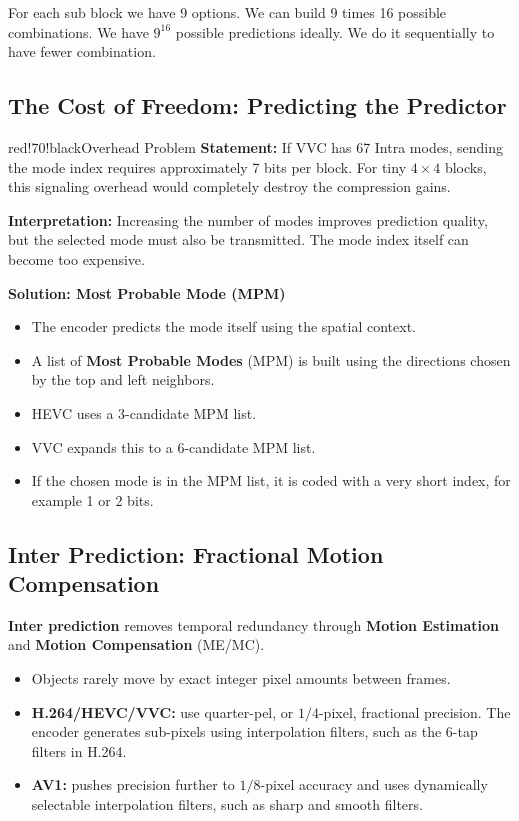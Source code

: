 For each sub block we have 9 options. We can build 9 times 16 possible combinations. We have $9^{16}$ possible predictions ideally. We do it sequentially to have fewer combination.
\subsection{The Cost of Freedom: Predicting the Predictor}

\begin{calloutbox}{red!70!black}{Overhead Problem}
\textbf{Statement:} If VVC has 67 Intra modes, sending the mode index requires approximately 7 bits per block. For tiny $4 \times 4$ blocks, this signaling overhead would completely destroy the compression gains.

\textbf{Interpretation:} Increasing the number of modes improves prediction quality, but the selected mode must also be transmitted. The mode index itself can become too expensive.
\end{calloutbox}

\textbf{Solution: Most Probable Mode (MPM)}

\begin{itemize}
\item The encoder predicts the mode itself using the spatial context.
\item A list of \textbf{Most Probable Modes} (MPM) is built using the directions chosen by the top and left neighbors.
\item HEVC uses a 3-candidate MPM list.
\item VVC expands this to a 6-candidate MPM list.
\item If the chosen mode is in the MPM list, it is coded with a very short index, for example 1 or 2 bits.
\end{itemize}

\subsection{Inter Prediction: Fractional Motion Compensation}

\textbf{Inter prediction} removes temporal redundancy through \textbf{Motion Estimation} and \textbf{Motion Compensation} (ME/MC).

\begin{itemize}
\item Objects rarely move by exact integer pixel amounts between frames.
\item \textbf{H.264/HEVC/VVC:} use quarter-pel, or $1/4$-pixel, fractional precision. The encoder generates sub-pixels using interpolation filters, such as the 6-tap filters in H.264.
\item \textbf{AV1:} pushes precision further to $1/8$-pixel accuracy and uses dynamically selectable interpolation filters, such as sharp and smooth filters.
\end{itemize}

